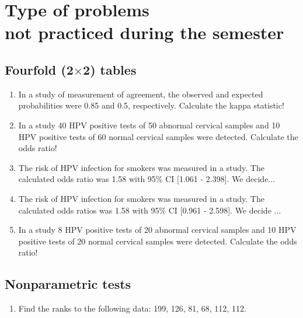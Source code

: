 \chapter[Further problems]{Type of problems\\ not practiced during the semester}

\section{Fourfold (2$\times$2) tables}
\begin{enumerate}
\item In a study of measurement of agreement, the observed and expected probabilities were 0.85 and 0.5, respectively. Calculate the kappa statistic! 
\item In a study 40 HPV positive tests of 50 abnormal cervical samples and 10 HPV positive tests of 60 normal cervical samples were detected. Calculate the odds ratio! 
\item The risk of HPV infection for smokers was measured in a study. The calculated odds ratio was 1.58 with 95\% CI [1.061 - 2.398]. We decide... 
\item The risk of HPV infection for smokers was measured in a study. The calculated odds ratios was 1.58 with 95\% CI [0.961 - 2.598]. We decide ... 
\item In a study 8 HPV positive tests of 20 abnormal cervical samples and 10 HPV positive tests of 20 normal cervical samples were detected. Calculate the odds ratio! 
\end{enumerate}

\section{Nonparametric tests}
\begin{enumerate}
\item Find the ranks to the following data: 199, 126, 81, 68, 112, 112.

\end{enumerate}

